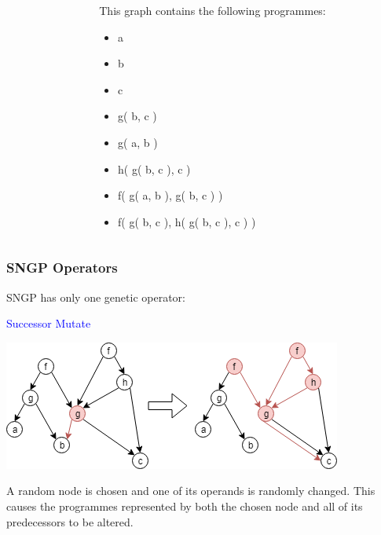 \documentclass{beamer}
\newcommand{\blue}[1]{\textcolor{blue}{#1}}
\begin{document}
\begin{frame}
\begin{frame}
\begin{columns}
\begin{column}{0.4\textwidth}
				\end{column}
			
				\begin{column}{0.6\textwidth}
					
					This graph contains the following programmes:
					
					\begin{itemize}
						\item a
						\item b
						\item c
						\item g( b, c )
						\item g( a, b )
						\item h( g( b, c ), c )
						\item f( g( a, b ), g( b, c ) )
						\item f( g( b, c ), h( g( b, c ), c ) )
					\end{itemize}
					
				\end{column}
				
			\end{columns}
			
		\end{frame}
	
		\begin{frame}
			\frametitle{SNGP Operators}
			
			SNGP has only one genetic operator:
			
			\begin{center}
				
				\blue{Successor Mutate}
				
				\includegraphics[scale=0.5]{resources/10_successor_mutate}
				
				A random node is chosen and one of its operands is randomly changed. This causes the programmes represented by both the chosen node and all of its predecessors to be altered.
				
			\end{center}
			
		\end{frame}
	

\end{frame}
\end{document}

